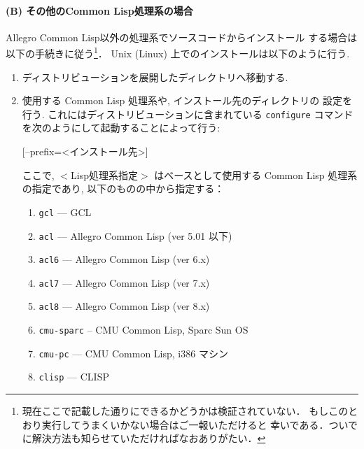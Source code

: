 \paragraph{(B) その他のCommon Lisp処理系の場合}

Allegro Common Lisp以外の処理系でソースコードからインストール
する場合は以下の手続きに従う\footnote{%
  現在ここで記載した通りにできるかどうかは検証されていない．
  もしこのとおり実行してうまくいかない場合はご一報いただけると
  幸いである．ついでに解決方法も知らせていただければなおありがたい．
}．
Unix (Linux) 上でのインストールは以下のように行う.
\begin{enumerate}
\item ディストリビューションを展開したディレクトリへ移動する.
\begin{vvtm}
\begin{examplev}
\end{examplev}
\end{vvtm}
\item 使用する Common Lisp 処理系や, インストール先のディレクトリの
  設定を行う. これにはディストリビューションに含まれている
  \texttt{configure} コマンドを次のようにして起動することによって行う:
\begin{vvtm}
\begin{simplev}
    [--prefix=<インストール先>]
\end{simplev}
\end{vvtm}

  ここで, $<$Lisp処理系指定$>$ はベースとして使用する Common Lisp 処理系
  の指定であり, 以下のものの中から指定する：

  \begin{enumerate}
    \item[(1)]\texttt{gcl} --- GCL
    \item[(2)]\texttt{acl} --- Allegro Common Lisp (ver 5.01 以下)
    \item[(3)]\texttt{acl6} --- Allegro Common Lisp (ver 6.x)
    \item[(4)]\texttt{acl7} --- Allegro Common Lisp (ver 7.x) 
    \item[(5)]\texttt{acl8} --- Allegro Common Lisp (ver 8.x)
    \item[(4)]\texttt{cmu-sparc} -- CMU Common Lisp, Sparc Sun OS
    \item[(5)]\texttt{cmu-pc} --- CMU Common Lisp, i386 マシン
    \item[(6)]\texttt{clisp} --- CLISP
  \end{enumerate}


\end{enumerate}
